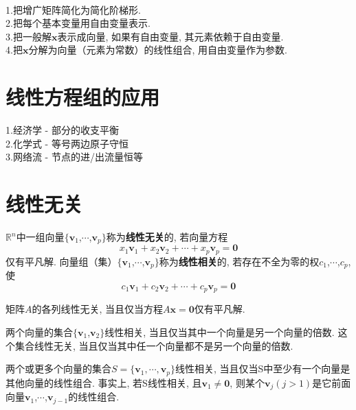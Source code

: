 \begin{law}\ \\
1.把增广矩阵简化为简化阶梯形.\\
2.把每个基本变量用自由变量表示.\\
3.把一般解$\bm{x}$表示成向量, 如果有自由变量, 其元素依赖于自由变量.\\
4.把$\bm{x}$分解为向量（元素为常数）的线性组合, 用自由变量作为参数.
\end{law}\vspace{4ex}

\section{线性方程组的应用}
1.经济学 - 部分的收支平衡\\
2.化学式 - 等号两边原子守恒\\
3.网络流 - 节点的进/出流量恒等\\[4ex]

\section{线性无关}
\begin{definition}
$\mathbb{R}^n$中一组向量$\{\bm{v}_1$,$\cdots$,$\bm{v}_p\}$称为\textbf{线性无关}的, 若向量方程
\[x_1\bm{v}_1+x_2\bm{v}_2+\cdots+x_p\bm{v}_p=\bm{0}\]
仅有平凡解. 向量组（集）$\{\bm{v}_1$,$\cdots$,$\bm{v}_p\}$称为\textbf{线性相关}的, 若存在不全为零的权$c_1$,$\cdots$,$c_p$, 使
\[c_1\bm{v}_1+c_2\bm{v}_2+\cdots+c_p\bm{v}_p=\bm{0}\]
\end{definition}\vspace{2ex}

\begin{law}
矩阵$A$的各列线性无关, 当且仅当方程$A\bm{x}=\bm{0}$仅有平凡解.
\end{law}\vspace{2ex}

\begin{law}
两个向量的集合$\{\bm{v}_1$,$\bm{v}_2\}$线性相关, 当且仅当其中一个向量是另一个向量的倍数. 这个集合线性无关, 当且仅当其中任一个向量都不是另一个向量的倍数.
\end{law}\vspace{4ex}

\begin{TheoremTwo}[线性相关集的特征]
两个或更多个向量的集合$S=\{\bm{v}_1,\cdots,\bm{v}_p\}$线性相关, 当且仅当S中至少有一个向量是其他向量的线性组合. 事实上, 若S线性相关, 且$\bm{v}_1\neq\bm{0}$, 则某个$\bm{v}_j$$(j>1)$是它前面向量$\bm{v}_1$,$\cdots$,$\bm{v}_{j-1}$的线性组合.
\end{TheoremTwo}\vspace{4ex}


